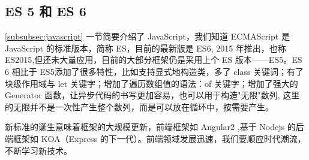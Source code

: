         \subsection{ES 5 和 ES 6}
          \label{subsubsec:es_5_和_es_6}
            \ref{subsubsec:javascript} 一节简要介绍了 JavaScript，我们知道 ECMAScript 是 JavaScript 的标准版本，简称 ES，目前的最新版是 ES6, 2015 年推出，也称 ES2015,但还未大量应用，目前的大部分框架仍是采用上个 ES 版本——ES5。ES 6 相比于 ES5添加了很多特性，比如支持显式地构造类，多了 class 关键词；有了块级作用域与 let 关键字；增加了遍历数组值的语法：of 关键字；增加了强大的 Generator 函数，让异步代码的书写更加容易，也可以用于构造"无限"数列, 这里的无限并不是一次性产生整个数列，而是可以放在循环中，按需要产生。
            \par
            新标准的诞生意味着框架的大规模更新，前端框架如 Angular2 ,基于 Nodejs 的后端框架如 KOA（Express 的下一代）。前端领域发展迅速，我们要顺应时代潮流，不断学习新技术。


